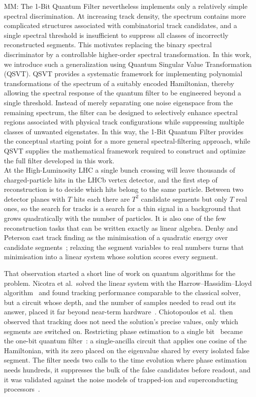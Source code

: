 \documentclass[11pt,a4paper]{article}
\newcommand{\mm}[1]{{\color{purple} MM: #1 }}
\begin{document}
\mm{
The 1-Bit Quantum Filter nevertheless implements only a relatively simple spectral discrimination. At increasing track density, the spectrum contains more complicated structures associated with combinatorial track candidates, and a single spectral threshold is insufficient to suppress all classes of incorrectly reconstructed segments. This motivates replacing the binary spectral discriminator by a controllable higher-order spectral transformation.
In this work, we introduce such a generalization using Quantum Singular Value Transformation (QSVT). QSVT provides a systematic framework for implementing polynomial transformations of the spectrum of a suitably encoded Hamiltonian, thereby allowing the spectral response of the quantum filter to be engineered beyond a single threshold. Instead of merely separating one noise eigenspace from the remaining spectrum, the filter can be designed to selectively enhance spectral regions associated with physical track configurations while suppressing multiple classes of unwanted eigenstates. In this way, the 1-Bit Quantum Filter provides the conceptual starting point for a more general spectral-filtering approach, while QSVT supplies the mathematical framework required to construct and optimize the full filter developed in this work.}
\\[0.5cm]


At the High-Luminosity LHC a single bunch crossing will leave thousands of charged-particle
hits in the LHCb vertex detector, and the first step of reconstruction is to decide which hits
belong to the same particle. Between two detector planes with $T$ hits each there are $T^2$
candidate segments but only $T$ real ones, so the search for tracks is a search for a thin
signal in a background that grows quadratically with the number of particles. It is also one
of the few reconstruction tasks that can be written exactly as linear algebra. Denby and
Peterson cast track finding as the minimisation of a quadratic energy over candidate
segments~\cite{denby1988,peterson1989}; relaxing the segment variables to real numbers turns
that minimisation into a linear system whose solution scores every segment.

That observation started a short line of work on quantum algorithms for the problem. Nicotra
et al.\ solved the linear system with the Harrow--Hassidim--Lloyd algorithm~\cite{hhl2009} and
found tracking performance comparable to the classical solver, but a circuit whose depth, and
the number of samples needed to read out its answer, placed it far beyond near-term
hardware~\cite{nicotra2023}. Chiotopoulos et al.\ then observed that tracking does not need the
solution's precise values, only which segments are switched on. Restricting phase estimation
to a single bit~\cite{trackhhl_epj} became the one-bit quantum filter~\cite{trackhhl}: a
single-ancilla circuit that applies one cosine of the Hamiltonian, with its zero placed on the
eigenvalue shared by every isolated false segment. The filter needs two calls to the time
evolution where phase estimation needs hundreds, it suppresses the bulk of the false candidates
before readout, and it was validated against the noise models of trapped-ion and
superconducting processors~\cite{trackhhl}.
\end{document}
